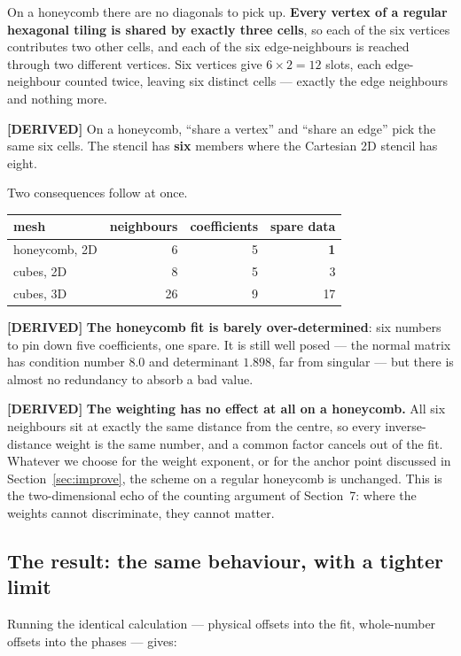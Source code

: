 \documentclass[11pt,a4paper]{article}
\newcommand{\derived}{\textcolor{blue!50!black}{\textbf{[DERIVED]}}}
\begin{document}
On a honeycomb there are no diagonals to pick up. \textbf{Every vertex of a regular hexagonal
tiling is shared by exactly three cells}, so each of the six vertices contributes two other
cells, and each of the six edge-neighbours is reached through two different vertices. Six
vertices give $6 \times 2 = 12$ slots, each edge-neighbour counted twice, leaving six distinct
cells --- exactly the edge neighbours and nothing more.

\derived{} On a honeycomb, ``share a vertex'' and ``share an edge'' pick the same six cells.
The stencil has \textbf{six} members where the Cartesian 2D stencil has eight.

Two consequences follow at once.

\begin{center}
\begin{tabular}{lrrr}
\toprule
mesh & neighbours & coefficients & spare data \\
\midrule
honeycomb, 2D & 6  & 5 & \textbf{1} \\
cubes, 2D     & 8  & 5 & 3 \\
cubes, 3D     & 26 & 9 & 17 \\
\bottomrule
\end{tabular}
\end{center}

\derived{} \textbf{The honeycomb fit is barely over-determined}: six numbers to pin down five
coefficients, one spare. It is still well posed --- the normal matrix has condition number
$8.0$ and determinant $1.898$, far from singular --- but there is almost no redundancy to
absorb a bad value.

\derived{} \textbf{The weighting has no effect at all on a honeycomb.} All six neighbours sit
at exactly the same distance from the centre, so every inverse-distance weight is the same
number, and a common factor cancels out of the fit. Whatever we choose for the weight
exponent, or for the anchor point discussed in Section~\ref{sec:improve}, the scheme on a
regular honeycomb is unchanged. This is the two-dimensional echo of the counting argument of
Section~7: where the weights cannot discriminate, they cannot matter.

\subsection{The result: the same behaviour, with a tighter limit}

Running the identical calculation --- physical offsets into the fit, whole-number offsets into
the phases --- gives:
\end{document}
